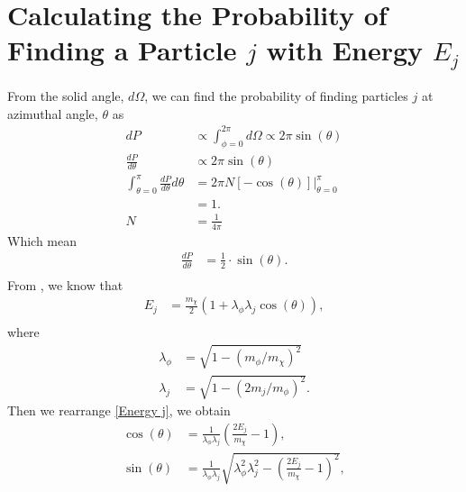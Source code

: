 \documentclass[10pt, oneside]{book}
\numberwithin{equation}{chapter}
\begin{document}
\section{Calculating the Probability of Finding a Particle $j$ with Energy $E_j$}
From the solid angle, $d\Omega$, we can find the probability of finding particles $j$ at azimuthal angle, $\theta$  \cite{Klangburam:2021vli} as
\begin{equation}
\begin{aligned}
    dP &\propto \int_{\phi=0}^{2\pi}d\Omega \propto 2\pi\sin(\theta)\\
    \frac{dP}{d\theta} &\propto 2\pi\sin(\theta)\\
    \int_{\theta =0}^{\pi}\frac{dP}{d\theta}d\theta &= 2\pi N[-\cos(\theta)]\Big|_{\theta = 0}^\pi\\
    &= 1.\\
    N &= \frac{1}{4\pi}
\end{aligned} 
\end{equation}
Which mean
\begin{equation}
\begin{aligned}
    \frac{dP}{d\theta} &= \frac{1}{2}\cdot\sin(\theta).\\
\end{aligned}
\end{equation}
From \cite{Klangburam:2021vli}, we know that
\begin{equation}\label{Energy j}
\begin{aligned}
    E_j &= \frac{m_\chi}{2}(1+\lambda_\phi\lambda_j\cos(\theta)),\\
\end{aligned}    
\end{equation}
where
\begin{equation}\label{lambda_phi_j}
\begin{aligned}
    \lambda_\phi &= \sqrt{1-(m_\phi/m_\chi)^2}\\
    \lambda_j &= \sqrt{1-(2m_j/m_\phi)^2}.
\end{aligned}
\end{equation}
Then we rearrange \autoref{Energy j}, we obtain
\begin{equation}
\begin{aligned}
    \cos(\theta) &= \frac{1}{\lambda_\phi\lambda_j}\left(\frac{2E_j}{m_\chi}-1\right),\\
    \sin(\theta) &= \frac{1}{\lambda_\phi\lambda_j} \sqrt{\lambda_\phi^2\lambda_j^2 - \left(\frac{2E_j}{m_\chi}-1\right)^2},
\end{aligned}
\end{equation}
\end{document}
